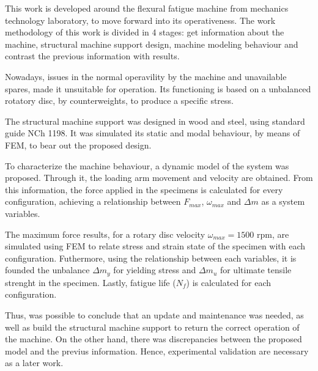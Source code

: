 
This work is developed around the flexural fatigue machine from mechanics technology laboratory, to move forward into its operativeness. The work methodology of this work is divided in 4 stages: get information about the machine, structural machine support design, machine modeling behaviour and contrast the previous information with results.

Nowadays, issues in the normal operavility by the machine and unavailable spares, made it unsuitable for operation. Its functioning is based on a unbalanced rotatory disc, by counterweights, to produce a specific stress.

The structural machine support was designed in wood and steel, using standard guide NCh 1198. It was simulated its static and modal behaviour, by means of FEM, to bear out the proposed design.

To characterize the machine behaviour, a dynamic model of the system was proposed. Through it, the loading arm movement and velocity are obtained. From this information, the force applied in the specimens is calculated for every configuration, achieving a relationship between $F_{max}$, $\omega_{max}$ and $\Delta m$ as a system variables.

The maximum force results, for a rotary disc velocity $\omega_{max}=1500$ rpm, are simulated using FEM to relate stress and strain state of the specimen with each configuration. Futhermore, using the relationship between each variables, it is founded the unbalance $\Delta m_y$ for yielding stress and $\Delta m_u$ for ultimate tensile strenght in the specimen. Lastly, fatigue life ($N_f$) is calculated for each configuration.

Thus, was possible to conclude that an update and maintenance was needed, as well as build the structural machine support to return the correct operation of the machine. On the other hand, there was discrepancies between the proposed model and the previus information. Hence, experimental validation are necessary as a later work.